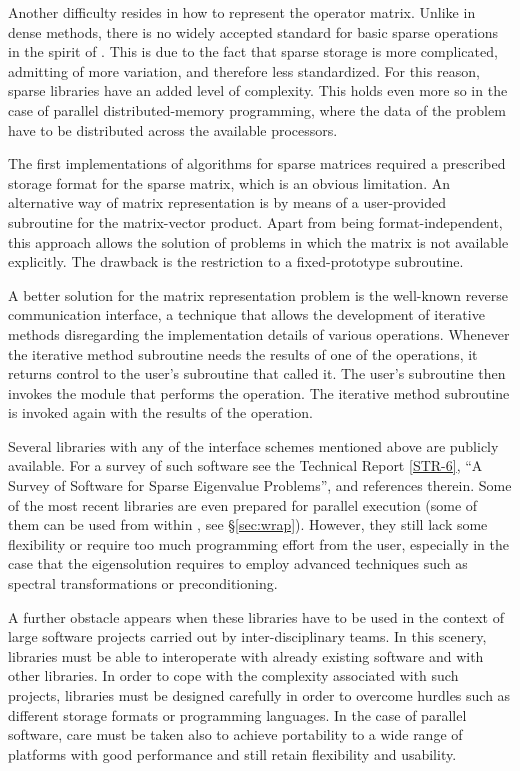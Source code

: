 	Another difficulty resides in how to represent the operator matrix. Unlike in dense methods, there is no widely accepted standard for basic sparse operations in the spirit of \blas. This is due to the fact that sparse storage is more complicated, admitting of more variation, and therefore less standardized. For this reason, sparse libraries have an added level of complexity. This holds even more so in the case of parallel distributed-memory programming, where the data of the problem have to be distributed across the available processors.
	
	The first implementations of algorithms for sparse matrices required a prescribed storage format for the sparse matrix, which is an obvious limitation. An alternative way of matrix representation is by means of a user-provided subroutine for the matrix-vector product. Apart from being format-independent, this approach allows the solution of problems in which the matrix is not available explicitly. The drawback is the restriction to a fixed-prototype subroutine. 

	A better solution for the matrix representation problem is the well-known reverse communication interface, a technique that allows the development of iterative methods disregarding the implementation details of various operations. Whenever the iterative method subroutine needs the results of one of the operations, it returns control to the user's subroutine that called it. The user's subroutine then invokes the module that performs the operation. The iterative method subroutine is invoked again with the results of the operation.

	Several libraries with any of the interface schemes mentioned above are publicly available. For a survey of such software see the \slepc Technical Report \hyperlink{str}{[STR-6]}, ``A Survey of Software for Sparse Eigenvalue Problems'', and references therein. Some of the most recent libraries are even prepared for parallel execution (some of them can be used from within \slepc, see \S\ref{sec:wrap}). However, they still lack some flexibility or require too much programming effort from the user, especially in the case that the eigensolution requires to employ advanced techniques such as spectral transformations or preconditioning.

	A further obstacle appears when these libraries have to be used in the context of large software projects carried out by inter-disciplinary teams. In this scenery, libraries must be able to interoperate with already existing software and with other libraries. In order to cope with the complexity associated with such projects, libraries must be designed carefully in order to overcome hurdles such as different storage formats or programming languages. In the case of parallel software, care must be taken also to achieve portability to a wide range of platforms with good performance and still retain flexibility and usability. 

